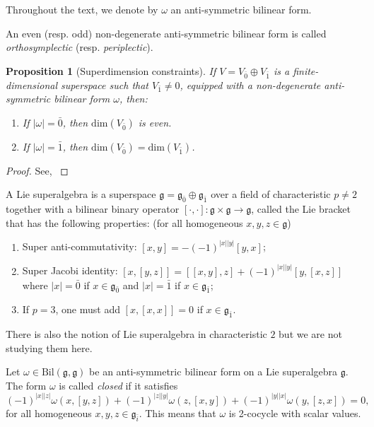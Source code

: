 \documentclass[12pt]{amsart}
\newtheorem{Proposition}[Theorem]{Proposition}
\newcommand{\fg}{\mathfrak{g}}
\newcommand {\ev} {{\bar0}}
\newcommand {\od} {{\bar1}}
\begin{document}
Throughout the text, we denote by $\omega$ an anti-symmetric bilinear form. 

An even (resp. odd) non-degenerate anti-symmetric  bilinear form is called {\it orthosymplectic} (resp. {\it periplectic}).  

\begin{Proposition}[Superdimension constraints]
If $V=V_{\bar{0}} \oplus V_{\bar{1}}$ is a finite-dimensional superspace such that $V_{\bar{1}} \not = {0}$, equipped with a non-degenerate anti-symmetric bilinear form $\omega$, then:

\begin{enumerate}[label=(\roman*)]

    \item[\textup{(}i\textup{)}] If $|\omega|=\bar{0}$, then $\mathrm{dim} (V_{\bar{0}})$ is even.\\
    \item[\textup{(}ii\textup{)}] If $|\omega|=\bar{1}$, then $\mathrm{dim}(V_{\bar{0}})=\mathrm{dim} (V_{\bar{1}})$.
    
\end{enumerate}

\end{Proposition}
\begin{proof} See, \cite{BM} \end{proof}
A Lie superalgebra is a superspace $\mathfrak{g} =  \mathfrak{g}_\ev \oplus \mathfrak{g}_\od$ over a field of characteristic $p \not = 2$ together with a bilinear binary operator $[\cdot, \cdot] : \mathfrak{g} \times \mathfrak{g} \rightarrow \mathfrak{g}$, called the Lie bracket that has the following properties: (for all homogeneous $x, y, z \in \mathfrak{g}$)


\begin{enumerate}
    \item[(i)] Super anti-commutativity: $[x, y] = -(-1)^{|x||y|}[y, x]$;
    \item[(ii)] Super Jacobi identity: $[x, [y, z]] = [[x, y], z] + (-1)^{|x||y|}[y, [x, z]]$ where $|x|={\bar 0}$ if $x \in \mathfrak{g}_{\bar 0}$ and $|x|={\bar 1}$ if $x \in \mathfrak{g}_{\bar 1}$;
    \item [(iii)] If $p=3$, one must add $[x,[x,x]]=0$ if $x\in \fg_{\bar 1}$.

\end{enumerate}
There is also the notion of Lie superalgebra in characteristic $2$ but we are not studying them here.


Let $\omega \in \mathrm{Bil}(\mathfrak{g}, \mathfrak{g})$ be an anti-symmetric bilinear form on a Lie superalgebra $\mathfrak g$. The form $\omega$ is called \emph{closed} if it satisfies
\[(-1)^{|x||z|}\omega(x, [y,z])+(-1)^{|z||y|}\omega(z,[x,y])+(-1)^{|y||x|}\omega(y,[z,x])=0,\]
for all homogeneous $x,y,z\in \fg_{\bar i}$. This means that $\omega$ is 2-cocycle with scalar values. 
\end{document}
